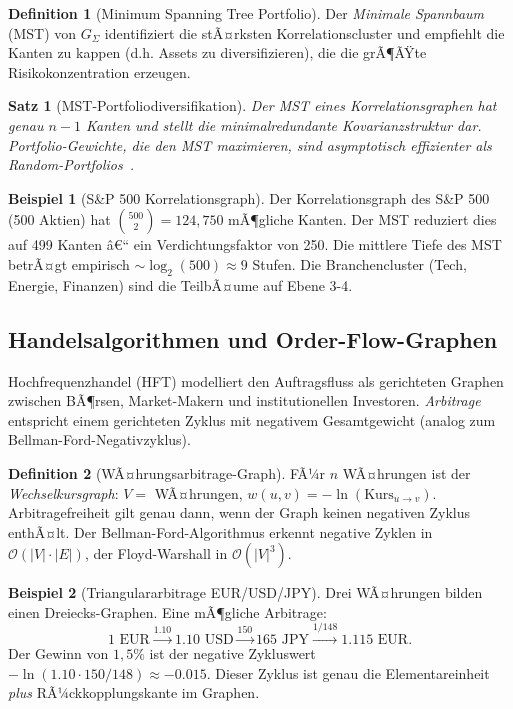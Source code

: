 ﻿\documentclass[12pt,a4paper,twoside]{article}
\theoremstyle{definition}
\newtheorem{definition}{Definition}[section]
\newtheorem{beispiel}{Beispiel}[section]
\theoremstyle{plain}
\newtheorem{theorem}{Satz}[section]
\theoremstyle{remark}
\begin{document}
\begin{definition}[Minimum Spanning Tree Portfolio]
Der \emph{Minimale Spannbaum} (MST) von $G_\Sigma$ identifiziert
die stÃ¤rksten Korrelationscluster und empfiehlt die Kanten
zu kappen (d.h. Assets zu diversifizieren), die die grÃ¶ÃŸte
Risikokonzentration erzeugen.
\end{definition}

\begin{theorem}[MST-Portfoliodiversifikation]
Der MST eines Korrelationsgraphen hat genau $n-1$ Kanten
und stellt die minimalredundante Kovarianzstruktur dar.
Portfolio-Gewichte, die den MST maximieren, sind asymptotisch
effizienter als Random-Portfolios~\cite{Mantegna1999}.
\end{theorem}

\begin{beispiel}[S\&P 500 Korrelationsgraph]
Der Korrelationsgraph des S\&P 500 (500 Aktien) hat
$\binom{500}{2} = 124{,}750$ mÃ¶gliche Kanten.  Der MST
reduziert dies auf 499 Kanten â€“ ein Verdichtungsfaktor von
250.  Die mittlere Tiefe des MST betrÃ¤gt empirisch
$\sim \log_2(500) \approx 9$ Stufen.  Die Branchencluster
(Tech, Energie, Finanzen) sind die TeilbÃ¤ume auf Ebene 3-4.
\end{beispiel}

\subsection{Handelsalgorithmen und Order-Flow-Graphen}

Hochfrequenzhandel (HFT) modelliert den Auftragsfluss als
gerichteten Graphen zwischen BÃ¶rsen, Market-Makern und
institutionellen Investoren.  \emph{Arbitrage} entspricht einem
gerichteten Zyklus mit negativem Gesamtgewicht (analog
zum Bellman-Ford-Negativzyklus).

\begin{definition}[WÃ¤hrungsarbitrage-Graph]
FÃ¼r $n$ WÃ¤hrungen ist der \emph{Wechselkursgraph}:
$V = $ WÃ¤hrungen, $w(u,v) = -\ln(\text{Kurs}_{u \to v})$.
Arbitragefreiheit gilt genau dann, wenn der Graph
keinen negativen Zyklus enthÃ¤lt.  Der Bellman-Ford-Algorithmus
erkennt negative Zyklen in $\mathcal{O}(|V| \cdot |E|)$,
der Floyd-Warshall in $\mathcal{O}(|V|^3)$.
\end{definition}

\begin{beispiel}[Triangulararbitrage EUR/USD/JPY]
Drei WÃ¤hrungen bilden einen Dreiecks-Graphen.  Eine mÃ¶gliche
Arbitrage:
\[
  1 \text{ EUR} \xrightarrow{1{.}10} 1{.}10 \text{ USD}
  \xrightarrow{150} 165 \text{ JPY}
  \xrightarrow{1/148} 1{.}115 \text{ EUR}.
\]
Der Gewinn von $1{,}5\%$ ist der negative Zykluswert
$-\ln(1{.}10 \cdot 150 / 148) \approx -0{.}015$.
Dieser Zyklus ist genau die Elementareinheit \emph{plus}
RÃ¼ckkopplungskante im Graphen.
\end{beispiel}
\end{document}
